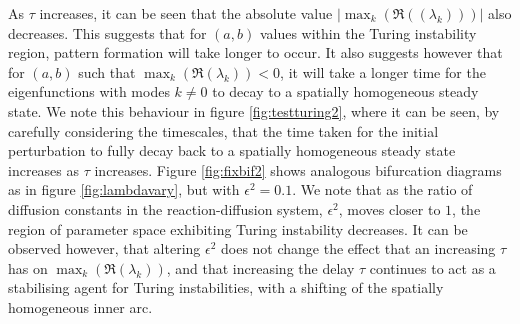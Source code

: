 As $\tau$ increases, it can be seen that the absolute value $|\max_k(\Re((\lambda_k)))|$ also decreases. This suggests that for $(a,b)$ values within the Turing instability region, pattern formation will take longer to occur. It also suggests however that for $(a,b)$ such that $\max_k(\Re(\lambda_k))<0$, it will take a longer time for the eigenfunctions with modes $k\neq0$ to decay to a spatially homogeneous steady state. We note this behaviour in figure \ref{fig:testturing2}, where it can be seen, by carefully considering the timescales, that the time taken for the initial perturbation to fully decay back to a spatially homogeneous steady state increases as $\tau$ increases. Figure \ref{fig:fixbif2} shows analogous bifurcation diagrams as in figure \ref{fig:lambdavary}, but with $\epsilon^2=0.1$. We note that as the ratio of diffusion constants in the reaction-diffusion system, $\epsilon^2$, moves closer to $1$, the region of parameter space exhibiting Turing instability decreases. It can be observed however, that altering $\epsilon^2$ does not change the effect that an increasing $\tau$ has on $\max_k(\Re(\lambda_k))$, and that increasing the delay $\tau$ continues to act as a stabilising agent for Turing instabilities, with a shifting of the spatially homogeneous inner arc.

